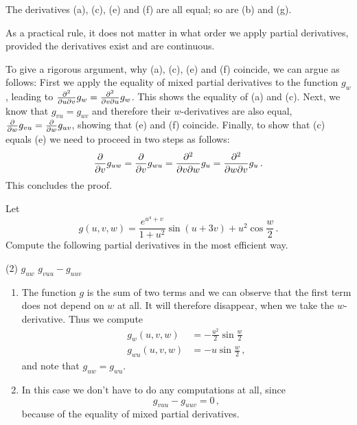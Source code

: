 \begin{solution}
The derivatives (a), (c), (e) and (f) are all equal; so are (b) and (g).

As a practical rule, it does not matter in what order we apply partial derivatives, provided the derivatives exist and are continuous.

To give a rigorous argument, why (a), (c), (e) and (f) coincide, we can argue as follows: First we apply the equality of mixed partial derivatives to the function $g_w$, leading to
$\frac{\partial^2}{\partial u \partial v} g_w = \frac{\partial^2}{\partial v \partial u} g_w$. This shows the equality of (a) and (c). Next, we know that $g_{vu} = g_{uv}$ and therefore their $w$-derivatives are also equal, $\frac{\partial}{\partial w} g_{vu} = \frac{\partial}{\partial w} g_{uv}$, showing that (e) and (f) coincide. Finally, to show that (c) equals (e) we need to proceed in two steps as follows:
\[
\frac{\partial}{\partial v} g_{uw} = \frac{\partial}{\partial v} g_{wu}
= \frac{\partial^2}{\partial v \partial w} g_{u} = \frac{\partial^2}{\partial w \partial v} g_{u}\,.
\]
This concludes the proof.
\end{solution}

\begin{question}
Let
\[
g(u, v, w) = \frac{e^{u^4 + v}}{ 1+ u^2} \sin\left(u + 3v \right) + u^2 \cos \frac w2\,.
\]
Compute the following partial derivatives in the most efficient way.
\begin{tasks}(2)
\task
$g_{uw}$
\task
$g_{vuu} - g_{uuv}$
\end{tasks}
\end{question}

\begin{solution}
\begin{enumerate}
\item
The function $g$ is the sum of two terms and we can observe that the first term does not depend on $w$ at all. It will therefore disappear, when we take the $w$-derivative. Thus we compute
\begin{align*}
g_{w}(u,v,w) &= -\frac{u^2}{2} \sin \frac w 2 \\
g_{wu}(u,v,w) &= -u \sin \frac w2\,,
\end{align*}
and note that $g_{uw} = g_{wu}$.

\item
In this case we don't have to do any computations at all, since
\[
g_{vuu} - g_{uuv} = 0\,,
\]
because of the equality of mixed partial derivatives.
\end{enumerate}
\end{solution}

